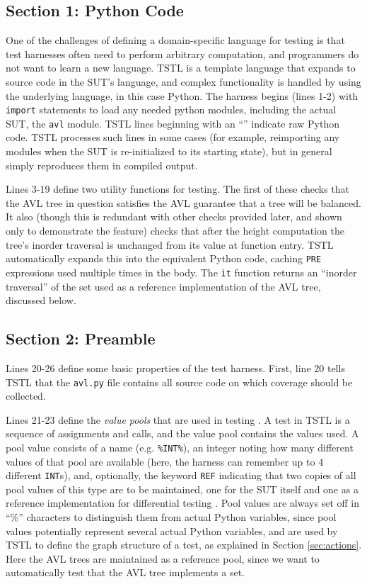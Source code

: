 \documentclass{sig-alternate}
\begin{document}
\subsection{Section 1: Python Code}

One of the challenges of defining a domain-specific language for
testing is that test harnesses often need to perform arbitrary
computation, and programmers do not want to learn a new language.
TSTL is a template language that expands to source code in the SUT's
language, and complex functionality is handled by using the underlying
language, in this case Python.  The harness begins (lines 1-2) with
{\tt import} statements to load any needed python modules, including
the actual SUT, the {\tt avl} module.  TSTL lines beginning with an
``\@'' indicate raw Python code.  TSTL processes such lines in some
cases (for example, reimporting any modules when the SUT is
re-initialized to its starting state), but in general simply
reproduces them in compiled output.  

Lines 3-19 define two utility functions for testing.  The first of
these checks that the AVL tree in question satisfies the AVL guarantee
that a tree will be balanced. It also (though this is redundant with
other checks provided later, and shown only to demonstrate the
feature) checks that after the height computation the tree's inorder
traversal is unchanged from its value at function entry.  TSTL
automatically expands this into the equivalent Python code, caching
{\tt PRE} expressions used multiple times in the body.  The {\tt it}
function returns an ``inorder traversal'' of the set used as a
reference implementation of the AVL tree, discussed below.

\subsection{Section 2: Preamble}

Lines 20-26 define some basic properties of the test harness.  First,
line 20 tells TSTL that the {\tt avl.py} file contains all source code
on which coverage should be collected.

Lines 21-23 define the \emph{value pools} that are used in testing
\cite{AndrewsTR,UDITA}.  A test in TSTL is a sequence of assignments
and calls, and the value pool contains the values used.  A pool value
consists of a name (e.g. {\tt \%INT\%}), an integer noting how many
different values of that pool are available (here, the harness can
remember up to 4 different {\tt INT}s), and, optionally, the keyword
{\tt REF} indicating that two copies of all pool values of this type
are to be maintained, one for the SUT itself and one as a reference
implementation for differential testing \cite{Differential,ICSEDiff}.
Pool values are always set off in ``\%'' characters to distinguish
them from actual Python variables, since pool values potentially
represent several actual Python variables, and are used by TSTL to
define the graph structure of a test, as explained in Section \ref{sec:actions}.
Here the AVL trees are maintained as a reference pool, since we want
to automatically test that the AVL tree implements a set.
\end{document}
